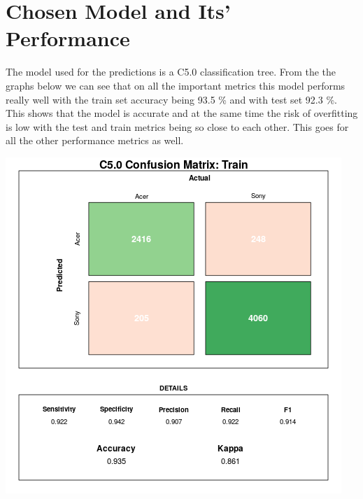 \documentclass[12pt,a4paper,leqno]{report}
\theoremstyle{plain}
\theoremstyle{definition}
\theoremstyle{remark}
\begin{document}
\section{Chosen Model and Its' Performance}

The model used for the predictions is a C5.0 classification tree. From the the graphs below we can see that
on all the important metrics this model performs really well with the train set accuracy being 93.5 \% and
with test set 92.3 \%. This shows that the model is accurate and at the same time
the risk of overfitting is low with the
test and train metrics being so close to each other. This goes for all the other performance metrics as well.

\bigskip
{
    \centering
    \includegraphics[width=\textwidth,height=\textheight,keepaspectratio]{cm_c5_train.png}
    \par
}
\bigskip
\end{document}
